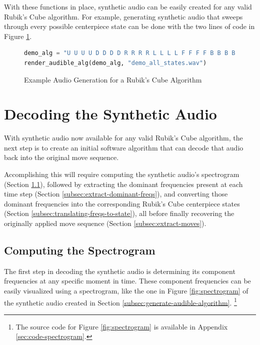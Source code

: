 With these functions in place, synthetic audio can be easily created
for any valid Rubik's Cube algorithm. For example, generating synthetic
audio that sweeps through every possible centerpiece state can be done
with the two lines of code in Figure \ref{fig:example-alg-audio}.

\begin{figure}[h]
\caption{Example Audio Generation for a Rubik's Cube Algorithm}
\label{fig:example-alg-audio}
\begin{lstlisting}[language=Python]
demo_alg = "U U U U D D D D R R R R L L L L F F F F B B B B"
render_audible_alg(demo_alg, "demo_all_states.wav")
\end{lstlisting}
\end{figure}


\section{Decoding the Synthetic Audio}
\label{sec:decoding-synthetic-audio}

With synthetic audio now available for any valid Rubik's Cube
algorithm, the next step is to create an initial software algorithm
that can decode that audio back into the original move sequence.

Accomplishing this will require computing the synthetic audio's
spectrogram (Section \ref{subsec:compute-spectrogram}), followed by
extracting the dominant frequencies present at each time step (Section
\ref{subsec:extract-dominant-freqs}), and converting those dominant
frequencies into the corresponding Rubik's Cube centerpiece states
(Section \ref{subsec:translating-freqs-to-state}), all before finally
recovering the originally applied move sequence (Section
\ref{subsec:extract-moves}).

\subsection{Computing the Spectrogram}
\label{subsec:compute-spectrogram}

The first step in decoding the synthetic audio is determining its
component frequencies at any specific moment in time. These component
frequencies can be easily visualized using a spectrogram, like the one
in Figure \ref{fig:spectrogram} of the synthetic audio created in
Section \ref{subsec:generate-audible-algorithm}. \footnote{The source
code for Figure \ref{fig:spectrogram} is available in Appendix
\ref{sec:code-spectrogram}.}

